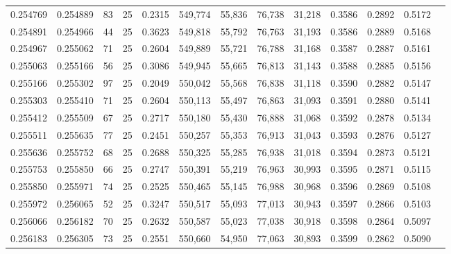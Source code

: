 \begin{tabular}{rrrrrrrrrrrrr}
0.254769 & 0.254889 &    83 &  25 &                                     0.2315 & 549,774 &  55,836 &  76,738 &  31,218 & 0.3586 & 0.2892 & 0.5172 \\
0.254891 & 0.254966 &    44 &  25 &                                     0.3623 & 549,818 &  55,792 &  76,763 &  31,193 & 0.3586 & 0.2889 & 0.5168 \\
0.254967 & 0.255062 &    71 &  25 &                                     0.2604 & 549,889 &  55,721 &  76,788 &  31,168 & 0.3587 & 0.2887 & 0.5161 \\
0.255063 & 0.255166 &    56 &  25 &                                     0.3086 & 549,945 &  55,665 &  76,813 &  31,143 & 0.3588 & 0.2885 & 0.5156 \\
0.255166 & 0.255302 &    97 &  25 &                                     0.2049 & 550,042 &  55,568 &  76,838 &  31,118 & 0.3590 & 0.2882 & 0.5147 \\
0.255303 & 0.255410 &    71 &  25 &                                     0.2604 & 550,113 &  55,497 &  76,863 &  31,093 & 0.3591 & 0.2880 & 0.5141 \\
0.255412 & 0.255509 &    67 &  25 &                                     0.2717 & 550,180 &  55,430 &  76,888 &  31,068 & 0.3592 & 0.2878 & 0.5134 \\
0.255511 & 0.255635 &    77 &  25 &                                     0.2451 & 550,257 &  55,353 &  76,913 &  31,043 & 0.3593 & 0.2876 & 0.5127 \\
0.255636 & 0.255752 &    68 &  25 &                                     0.2688 & 550,325 &  55,285 &  76,938 &  31,018 & 0.3594 & 0.2873 & 0.5121 \\
0.255753 & 0.255850 &    66 &  25 &                                     0.2747 & 550,391 &  55,219 &  76,963 &  30,993 & 0.3595 & 0.2871 & 0.5115 \\
0.255850 & 0.255971 &    74 &  25 &                                     0.2525 & 550,465 &  55,145 &  76,988 &  30,968 & 0.3596 & 0.2869 & 0.5108 \\
0.255972 & 0.256065 &    52 &  25 &                                     0.3247 & 550,517 &  55,093 &  77,013 &  30,943 & 0.3597 & 0.2866 & 0.5103 \\
0.256066 & 0.256182 &    70 &  25 &                                     0.2632 & 550,587 &  55,023 &  77,038 &  30,918 & 0.3598 & 0.2864 & 0.5097 \\
0.256183 & 0.256305 &    73 &  25 &                                     0.2551 & 550,660 &  54,950 &  77,063 &  30,893 & 0.3599 & 0.2862 & 0.5090 \\

\end{tabular}
